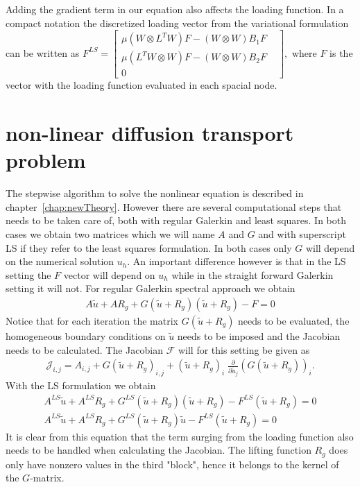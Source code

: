 Adding the gradient term in our equation also affects the loading function. In a compact notation the discretized loading vector from the variational formulation can be written as
$
F^{LS}=
\begin{bmatrix}
	\mu(W \otimes L^T W)F - (W \otimes W)B_1F \\
	\mu(L^TW \otimes W)F - (W \otimes W)B_2F \\
	0 & 
	\label{mat:FLS}
\end{bmatrix},
$
where $F$ is the vector with the loading function evaluated in each spacial node.
%
\section{non-linear diffusion transport problem}
The stepwise algorithm to solve the nonlinear equation is described in chapter~\ref{chap:newTheory}. However there are several computational steps that needs to be taken care of, both with regular Galerkin and least squares. In both cases we obtain two matrices which we will name $A$ and $G$ and with superscript LS if they refer to the least squares formulation. In both cases only $G$ will depend on the numerical solution $u_h$. An important difference however is that in the LS setting the $F$ vector will depend on $u_h$ while in the straight forward Galerkin setting it will not. For regular Galerkin spectral approach we obtain
%
\begin{align}
	A \tilde{u} + AR_g  + G(\tilde{u}+R_g)(\tilde{u}+R_g) -F = 0
\end{align}
Notice that for each iteration the matrix $G(\tilde{u}+R_g)$ needs to be evaluated, the homogeneous boundary conditions on $\tilde{u}$ needs to be imposed and the Jacobian needs to be calculated. The Jacobian $\mathcal{F}$ will for this setting be given as
%
\begin{align}
	\mathcal{J}_{i,j} = A_{i,j} + G(\tilde{u}+R_g)_{i,j} +  (\tilde{u}+R_g)_i \; \frac{\partial}{\partial \tilde{u}_j} (G(\tilde{u}+R_g))_i.
\end{align}
%
With the LS formulation we obtain
\begin{align}
A^{LS}\tilde{u} + A^{LS}R_g  + G^{LS}(\tilde{u}+R_g)(\tilde{u}+R_g) -F^{LS}(\tilde{u}+R_g) = 0\\
A^{LS}\tilde{u} + A^{LS}R_g  + G^{LS}(\tilde{u}+R_g)\tilde{u} -F^{LS}(\tilde{u}+R_g) = 0
\end{align}
It is clear from this equation that the term surging from the loading function also needs to be handled when calculating the Jacobian. The lifting function $R_g$ does only have nonzero values in the third "block", hence it belongs to the kernel of the $G$-matrix.

